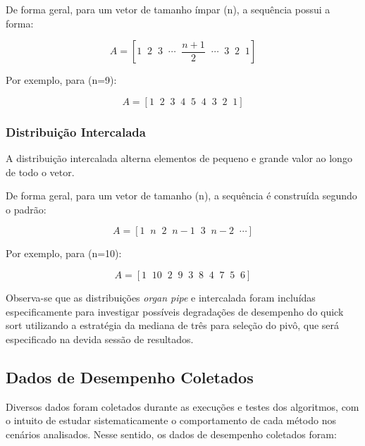 \documentclass{article}
\begin{document}
De forma geral, para um vetor de tamanho ímpar (n), a sequência possui a forma:

\[
A =
\left[
1 \;\;
2 \;\;
3 \;\;
\cdots \;\;
\frac{n+1}{2}
\;\;
\cdots \;\;
3 \;\;
2 \;\;
1
\right]
\]

Por exemplo, para (n=9):

\[
A =
[1 \;\; 2 \;\; 3 \;\; 4 \;\; 5 \;\; 4 \;\; 3 \;\; 2 \;\; 1]
\]

\subsubsection{Distribuição Intercalada}

A distribuição intercalada alterna elementos de pequeno e grande valor ao longo de todo o vetor.

De forma geral, para um vetor de tamanho (n), a sequência é construída segundo o padrão:

\[
A =
[1 \;\; n \;\; 2 \;\; n-1 \;\; 3 \;\; n-2 \;\; \cdots]
\]

Por exemplo, para (n=10):

\[
A =
[1 \;\; 10 \;\; 2 \;\; 9 \;\; 3 \;\; 8 \;\; 4 \;\; 7 \;\; 5 \;\; 6]
\]

Observa-se que as distribuições \textit{organ pipe} e intercalada foram incluídas especificamente para investigar possíveis degradações de desempenho do quick sort utilizando a estratégia da mediana de três para seleção do pivô, que será especificado na devida sessão de resultados.

\subsection{Dados de Desempenho Coletados}

Diversos dados foram coletados durante as execuções e testes dos algoritmos, com o intuito de estudar sistematicamente o comportamento de cada método nos cenários analisados. 
Nesse sentido, os dados de desempenho coletados foram:
\end{document}
